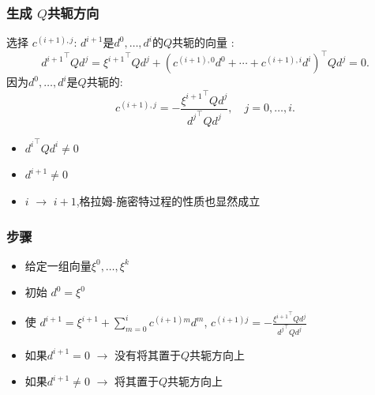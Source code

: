 \documentclass{beamer}
\begin{document}
		\begin{frame}
		\frametitle{\secno 生成 $Q$共轭方向}
		选择 $c^{(i+1),j}$:  $d^{i+1}$是$d^0,\dots, d^i$的$Q$共轭的向量 :
		\begin{equation}
			{d^{i+1}}^{\top}Qd^j={{\xi}^{i+1}}^{\top}Qd^j+({c^{(i+1),0}d^0 +\cdots + c^{(i+1),i}d^i})^{\top}Qd^j=0.
		\end{equation}
		因为$d^0,\dots,d^i$是$Q$共轭的:
		\begin{equation}
			c^{(i+1),j}=-\frac{{{\xi}^{i+1}}^{\top}Qd^j}{{d^j}^{\top}Qd^j},\quad j=0,\dots,i.
		\end{equation}
		\begin{itemize}
			\item   ${d^i}^{\top}Qd^i\neq 0$
			\item $d^{i+1} \neq 0$
			\item  $i$ $\rightarrow$ $i + 1$,格拉姆-施密特过程的性质也显然成立
		\end{itemize}
		
	\end{frame}
	\begin{frame}
		\frametitle{步骤}
		\begin{itemize}
			\item 给定一组向量${\xi}^0,\dots,{\xi}^k$ \hint{(不一定线性无关)}
			\item 初始 $d^0={\xi}^0$
			\item 使 $d^{i+1}={\xi}^{i+1}+\sum_{m=0}^i c^{(i+1)m}d^m$,   $c^{(i+1)j}=-\frac{{{\xi}^{i+1}}^{\top}Qd^j}{{d^j}^{\top}Qd^j}$
			\item 如果$d^{i+1}=0$  $\rightarrow$ 没有将其置于$Q$共轭方向上
			\item 如果$d^{i+1}\neq 0$ $\rightarrow $ 将其置于$Q$共轭方向上
			
		\end{itemize}
		
	\end{frame}
\end{document}
